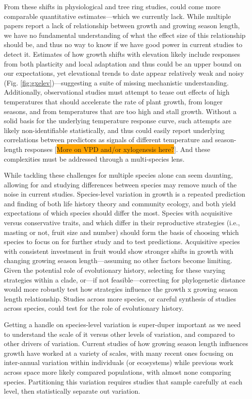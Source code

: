 \documentclass[11pt]{article}
\begin{document}
From these shifts in physiological and tree ring studies, could come more comparable quantitative estimates---which we currently lack. While multiple papers report a lack of relationship between growth and growing season length, we have no fundamental understanding of what the effect size of this relationship should be, and thus no way to know if we have good power in current studies to detect it. Estimates of how growth shifts with elevation likely include responses from both plasticity and local adaptation and thus could be an upper bound on our expectations, yet elevational trends to date appear relatively weak and noisy (Fig. \ref{fig:gxelev})---suggesting a suite of missing mechanistic understanding. Additionally, observational studies must attempt to tease out effects of high temperatures that should accelerate the rate of plant growth, from longer seasons, and from temperatures that are too high and stall growth. Without a solid basis for the underlying temperature response curve, such attempts are likely non-identifiable statistically, and thus could easily report underlying correlations between predictors as signals of different temperature and season-length responses [\colorbox{orange}{More on VPD and/or xylogenesis here?}]. And these complexities must be addressed through a multi-species lens.

While tackling these challenges for multiple species alone can seem daunting, allowing for and studying differences between species may remove much of the noise in current studies. Species-level variation in growth is a repeated prediction and finding of both life history theory and community ecology, and both yield expectations of which species should differ the most. Species with acquisitive versus conservative traits, and which differ in their reproductive strategies (i.e., masting or not, fruit size and number) should form the basis of choosing which species to focus on for further study and to test predictions. Acquisitive species with consistent investment in fruit would show stronger shifts in growth with changing growing season length---assuming no other factors become limiting. Given the potential role of evolutionary history, selecting for these varying strategies within a clade, or---if not feasible---correcting for phylogenetic distance would more robustly test how strategies influence the growth x growing season length relationship. Studies across more species, or careful synthesis of studies across species, could test for the role of evolutionary history.

Getting a handle on species-level variation is super-duper important as we need to understand the scale of it versus other levels of variation, and compared to other drivers of variation. Current studies of how growing season length influences growth have worked at a variety of scales, with many recent ones focusing on inter-annual variation within individuals (or ecosystems) while previous work across space more likely compared populations, with almost none comparing species. Partitioning this variation requires studies that sample carefully at each level, then statistically separate out variation. 
\end{document}
